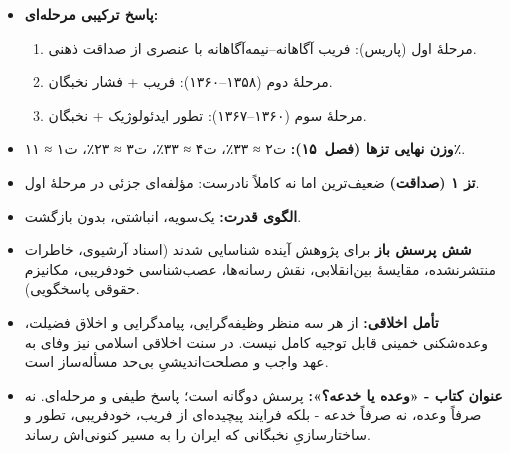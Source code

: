\documentclass[12pt,a4paper]{book}
\begin{document}

\begin{principleBox}
\begin{itemize}
\item \textbf{پاسخ ترکیبی مرحله‌ای:}
  \begin{enumerate}[nosep]
    \item مرحلهٔ اول (پاریس):
      \textcolor{cAccent}{فریب آگاهانه–نیمه‌آگاهانه}
      با عنصری از صداقت ذهنی.
    \item مرحلهٔ دوم (۱۳۵۸–۱۳۶۰):
      \textcolor{cAccent}{فریب} + \textcolor{cConsolid}{فشار نخبگان}.
    \item مرحلهٔ سوم (۱۳۶۰–۱۳۶۷):
      \textcolor{cGold}{تطور ایدئولوژیک} + \textcolor{cConsolid}{نخبگان}.
  \end{enumerate}

\item \textbf{وزن نهایی تزها (فصل~۱۵):}
  \textcolor{cAccent}{ت‌۲ ≈ ۳۳٪}،
  \textcolor{cConsolid}{ت‌۴ ≈ ۳۳٪}،
  \textcolor{cGold}{ت‌۳ ≈ ۲۳٪}،
  \textcolor{cGreen}{ت‌۱ ≈ ۱۱٪}.

\item \textbf{تز ۱ (صداقت)} ضعیف‌ترین اما نه کاملاً نادرست:
  مؤلفه‌ای جزئی در مرحلهٔ اول.

\item \textbf{الگوی قدرت:} یک‌سویه، انباشتی، بدون بازگشت.

\item \textbf{شش پرسش باز} برای پژوهش آینده شناسایی شدند
  (اسناد آرشیوی، خاطرات منتشرنشده، مقایسهٔ بین‌انقلابی،
  نقش رسانه‌ها، عصب‌شناسی خودفریبی، مکانیزم حقوقی پاسخگویی).

\item \textbf{تأمل اخلاقی:}
  از هر سه منظر وظیفه‌گرایی، پیامدگرایی و اخلاق فضیلت،
  وعده‌شکنی خمینی قابل توجیه کامل نیست.
  در سنت اخلاقی اسلامی نیز
  وفای به عهد واجب و مصلحت‌اندیشیِ بی‌حد مسأله‌ساز است.

\item \textbf{عنوان کتاب - «وعده یا خدعه؟»:}
  پرسش دوگانه است؛ پاسخ طیفی و مرحله‌ای.
  نه صرفاً وعده، نه صرفاً خدعه -
  بلکه فرایند پیچیده‌ای از فریب، خودفریبی،
  تطور و ساختارسازیِ نخبگانی
  که ایران را به مسیر کنونی‌اش رساند.
\end{itemize}
\end{principleBox}

\appendix
\renewcommand{\chaptername}{پیوست}
\end{document}
